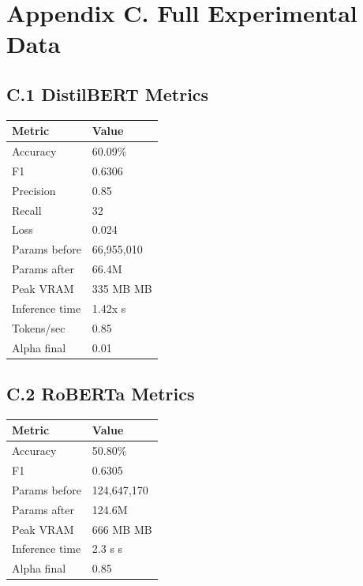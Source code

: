 
\section{Appendix C. Full Experimental Data}

\subsection{C.1 DistilBERT Metrics}

\begin{table}[H]
\centering
\small
\begin{tabular}{ll}
\toprule
\textbf{Metric} & \textbf{Value} \\
\midrule
Accuracy & 60.09\% \\
F1 & 0.6306 \\
Precision & 0.85 \\
Recall & 32 \\
Loss & 0.024 \\
Params before & 66,955,010 \\
Params after & 66.4M \\
Peak VRAM & 335 MB MB \\
Inference time & 1.42x s \\
Tokens/sec & 0.85 \\
Alpha final & 0.01 \\
\bottomrule
\end{tabular}
\end{table}

\subsection{C.2 RoBERTa Metrics}

\begin{table}[H]
\centering
\small
\begin{tabular}{ll}
\toprule
\textbf{Metric} & \textbf{Value} \\
\midrule
Accuracy & 50.80\% \\
F1 & 0.6305 \\
Params before & 124,647,170 \\
Params after & 124.6M \\
Peak VRAM & 666 MB MB \\
Inference time & 2.3 s s \\
Alpha final & 0.85 \\
\bottomrule
\end{tabular}
\end{table}

